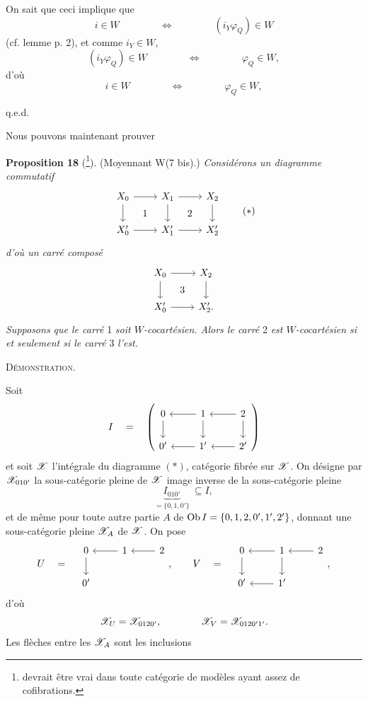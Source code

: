 On sait que ceci implique que
\[
i \in W \qquad\qquad \Longleftrightarrow \qquad\qquad (i_Y\varphi_Q) \in W
\]
(cf. lemme p. 2), et comme $i_Y \in W$,
\[
(i_Y\varphi_Q) \in W \qquad\qquad \Longleftrightarrow \qquad\qquad \varphi_Q \in W,
\]
d'où
\[
i \in W \qquad\qquad \Longleftrightarrow \qquad\qquad \varphi_Q \in W,
\]

\hfill q.e.d.

Nous pouvons maintenant prouver


\textbf{Proposition 18} (\footnote[127]{devrait être vrai dans toute catégorie de modèles ayant assez de cofibrations.}). (Moyennant W(7 bis).) \textit{Considérons un diagramme commutatif}
\[
\begin{tikzcd}[ampersand replacement=\&]
X_0 \arrow[r] \arrow[d] \arrow[rd, phantom, "1"] \& X_1 \arrow[r] \arrow[d] \arrow[rd, phantom, "2"] \& X_2 \arrow[d] \\
X'_0 \arrow[r] \& X'_1 \arrow[r] \& X'_2
\end{tikzcd}
\tag*{$(\ast)$}
\]
\textit{d'où un carré composé}
\[
\begin{tikzcd}[ampersand replacement=\&]
X_0 \arrow[r] \arrow[d] \arrow[rd, phantom, "3"] \& X_2 \arrow[d] \\
X'_0 \arrow[r] \& X'_2.
\end{tikzcd}
\]
\textit{Supposons que le carré} 1 \textit{soit $W$-cocartésien. Alors le carré} 2 \textit{est $W$-cocartésien si et seulement si le carré} 3 \textit{l'est.}

\textsc{Démonstration.}




Soit
\[
I \quad = \quad
\left(
\begin{tikzcd}[ampersand replacement=\&]
0 \arrow[d] \& 1 \arrow[l] \arrow[d] \& 2 \arrow[l] \arrow[d] \\
0' \& 1' \arrow[l] \& 2' \arrow[l]
\end{tikzcd}
\right)
\]
et soit $\mathscr{X}$ l'intégrale du diagramme $(\ast)$, catégorie fibrée sur $\mathscr{X}$. On désigne par $\mathscr{X}_{010'}$ la sous-catégorie pleine de $\mathscr{X}$ image inverse de la sous-catégorie pleine %
\[
\underbrace{I_{010'}}_{=\{0,1,0'\}} \ \subseteq I,
\]
et de même pour toute autre partie $A$ de $\operatorname{Ob} I = \{0,1,2,0',1',2'\}$, donnant une sous-catégorie pleine $\mathscr{X}_A$ de $\mathscr{X}$. On pose
\[
U \quad = \quad
\begin{tikzcd}[ampersand replacement=\&]
0 \arrow[d] \& 1 \arrow[l] \& 2 \arrow[l] \\
0' \& \&
\end{tikzcd}
, \qquad
V \quad = \quad
\begin{tikzcd}[ampersand replacement=\&]
0 \arrow[d] \& 1 \arrow[l] \arrow[d] \& 2 \arrow[l] \\
0' \& 1' \arrow[l] \&
\end{tikzcd}
,
\]
d'où
\[
\mathscr{X}_U = \mathscr{X}_{0120'}, \qquad\qquad \mathscr{X}_V = \mathscr{X}_{0120'1'}.
\]
Les flèches entre les $\mathscr{X}_A$ sont les inclusions

